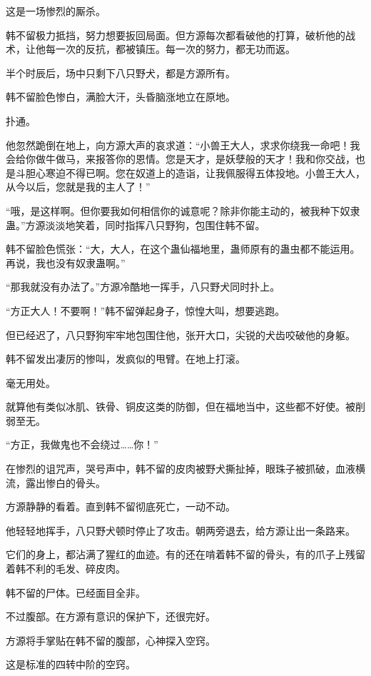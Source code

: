 
\begin{this_body}

这是一场惨烈的厮杀。

韩不留极力抵挡，努力想要扳回局面。但方源每次都看破他的打算，破析他的战术，让他每一次的反抗，都被镇压。每一次的努力，都无功而返。

半个时辰后，场中只剩下八只野犬，都是方源所有。

韩不留脸色惨白，满脸大汗，头昏脑涨地立在原地。

扑通。

他忽然跪倒在地上，向方源大声的哀求道：“小兽王大人，求求你绕我一命吧！我会给你做牛做马，来报答你的恩情。您是天才，是妖孽般的天才！我和你交战，也是斗胆心寒迫不得已啊。您在奴道上的造诣，让我佩服得五体投地。小兽王大人，从今以后，您就是我的主人了！”

“哦，是这样啊。但你要我如何相信你的诚意呢？除非你能主动的，被我种下奴隶蛊。”方源淡淡地笑着，同时指挥八只野狗，包围住韩不留。

韩不留脸色慌张：“大，大人，在这个蛊仙福地里，蛊师原有的蛊虫都不能运用。再说，我也没有奴隶蛊啊。”

“那我就没有办法了。”方源冷酷地一挥手，八只野犬同时扑上。

“方正大人！不要啊！”韩不留弹起身子，惊惶大叫，想要逃跑。

但已经迟了，八只野狗牢牢地包围住他，张开大口，尖锐的犬齿咬破他的身躯。

韩不留发出凄厉的惨叫，发疯似的甩臂。在地上打滚。

毫无用处。

就算他有类似冰肌、铁骨、铜皮这类的防御，但在福地当中，这些都不好使。被削弱至无。

“方正，我做鬼也不会绕过……你！”

在惨烈的诅咒声，哭号声中，韩不留的皮肉被野犬撕扯掉，眼珠子被抓破，血液横流，露出惨白的骨头。

方源静静的看着。直到韩不留彻底死亡，一动不动。

他轻轻地挥手，八只野犬顿时停止了攻击。朝两旁退去，给方源让出一条路来。

它们的身上，都沾满了猩红的血迹。有的还在啃着韩不留的骨头，有的爪子上残留着韩不利的毛发、碎皮肉。

韩不留的尸体。已经面目全非。

不过腹部。在方源有意识的保护下，还很完好。

方源将手掌贴在韩不留的腹部，心神探入空窍。

这是标准的四转中阶的空窍。


\end{this_body}
